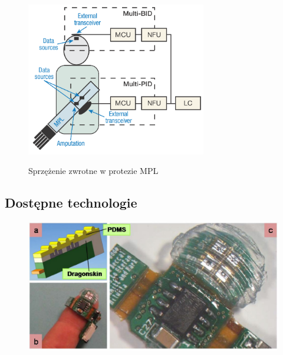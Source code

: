 \documentclass[8pt]{beamer}
\begin{document}
		
		
		\begin{frame}
			\begin{center}
				\begin{figure}
					\includegraphics[width=0.7\textwidth]{graphics/MPL_ster.png}
					\label{graph:mems}	
					\caption{Sprzężenie zwrotne w protezie MPL \cite{tenore}}
				\end{figure}
			\end{center}
		\end{frame}	

	\subsection{Dostępne technologie}
		\begin{frame}
			\begin{center}
				\begin{figure}
					\includegraphics[width=\textwidth]{graphics/roughness_mems.jpg}
					\label{graph:mems}	
					\caption{ \cite{5420491}}
				\end{figure}
			\end{center}
		\end{frame}		
		
\end{document}
